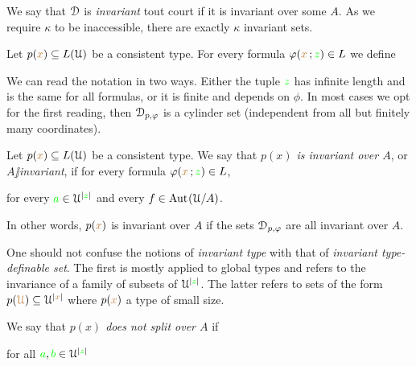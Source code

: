 \documentclass[creche.tex]{subfiles}
\begin{document}
We say that $\EuScript D$ is \emph{invariant\/} tout court if it is invariant over some $A$. As we require $\kappa$ to be inaccessible, there are exactly $\kappa$ invariant sets.

% 



Let $p({\color{brown} x})\subseteq L(\EuScript U)$ be a consistent type. For every formula $\varphi({\color{brown} x}\,;{\color{green} z})\in L$ we define


We can read the notation in two ways. Either the tuple ${\color{green} z}$ has infinite length and is the same for all formulas, or it is finite and depends on $\phi$. In most cases we opt for the first reading, then $\EuScript D_{p,\varphi}$ is a cylinder set (independent from all but finitely many coordinates).

Let $p({\color{brown} x})\subseteq L(\EuScript U)$ be a consistent type. We say that \emph{$p(x)$ is invariant over $A$}, or \emph{$A\jj$invariant}, if for every formula $\varphi({\color{brown} x}\,;{\color{green} z})\in L$, 

\hfill for every ${\color{green} a}\in\EuScript U^{|{\color{green} z}|}$ and every $f\in\textrm{Aut\kern.15ex}(\EuScript U/A)$.

In other words, $p({\color{brown} x})$ is invariant over $A$ if the sets $\EuScript D_{p,\varphi}$ are all invariant over $A$. 

One should not confuse the notions of \textit{invariant type\/} with that of \textit{invariant type-definable set}. The first is mostly applied to global types and refers to the invariance of a family of subsets of $\EuScript U^{|{\color{green} z}|}$. The latter refers to sets of the form $p({\color{brown}\EuScript U})\subseteq\EuScript U^{|{\color{brown} x}|}$ where $p({\color{brown} x})$ a type of small size.

We say that \emph{$p(x)$ does not split over $A$\/} if

\hfill for all ${\color{green} a},{\color{green} b}\in\EuScript U^{|{\color{green} z}|}$
\end{document}
